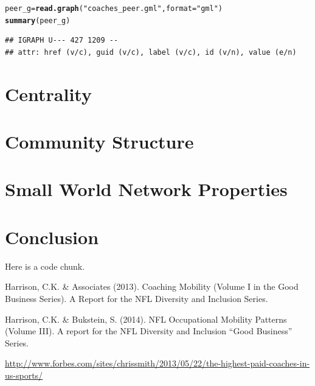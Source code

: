 \documentclass{article}\usepackage[]{graphicx}\usepackage[]{color}
\makeatletter
\newcommand{\hlstr}[1]{\textcolor[rgb]{0.192,0.494,0.8}{#1}}%
\newcommand{\hlstd}[1]{\textcolor[rgb]{0.345,0.345,0.345}{#1}}%
\newcommand{\hlkwb}[1]{\textcolor[rgb]{0.69,0.353,0.396}{#1}}%
\newcommand{\hlkwc}[1]{\textcolor[rgb]{0.333,0.667,0.333}{#1}}%
\newcommand{\hlkwd}[1]{\textcolor[rgb]{0.737,0.353,0.396}{\textbf{#1}}}%
\newenvironment{kframe}{%
 \def\at@end@of@kframe{}%
 \ifinner\ifhmode%
  \def\at@end@of@kframe{\end{minipage}}%
  \begin{minipage}{\columnwidth}%
 \fi\fi%
 \def\FrameCommand##1{\hskip\@totalleftmargin \hskip-\fboxsep
 \colorbox{shadecolor}{##1}\hskip-\fboxsep
     \hskip-\linewidth \hskip-\@totalleftmargin \hskip\columnwidth}%
 \MakeFramed {\advance\hsize-\width
   \@totalleftmargin\z@ \linewidth\hsize
   \@setminipage}}%
 {\par\unskip\endMakeFramed%
 \at@end@of@kframe}
\newenvironment{knitrout}{}{} %
\makeatother
\begin{document}
\begin{knitrout}
\color{fgcolor}\begin{kframe}
\begin{alltt}
\hlstd{peer_g} \hlkwb{=} \hlkwd{read.graph}\hlstd{(}\hlstr{"coaches_peer.gml"}\hlstd{,}\hlkwc{format}\hlstd{=}\hlstr{"gml"}\hlstd{)}
\hlkwd{summary}\hlstd{(peer_g)}
\end{alltt}
\begin{verbatim}
## IGRAPH U--- 427 1209 -- 
## attr: href (v/c), guid (v/c), label (v/c), id (v/n), value (e/n)
\end{verbatim}
\end{kframe}
\end{knitrout}

\section{Centrality}

\section{Community Structure}

\section{Small World Network Properties}

\section{Conclusion}

Here is a code chunk.

%
%
\begin{thebibliography}{99}

 Harrison, C.K. \& Associates (2013). Coaching Mobility (Volume I in the Good Business Series). A Report for the NFL Diversity and Inclusion Series.

 Harrison, C.K. \& Bukstein, S. (2014). NFL Occupational Mobility Patterns (Volume III). A report for the NFL Diversity and Inclusion “Good Business” Series.

  \url{http://www.forbes.com/sites/chrissmith/2013/05/22/the-highest-paid-coaches-in-us-sports/}

\end{thebibliography}
\end{document}
